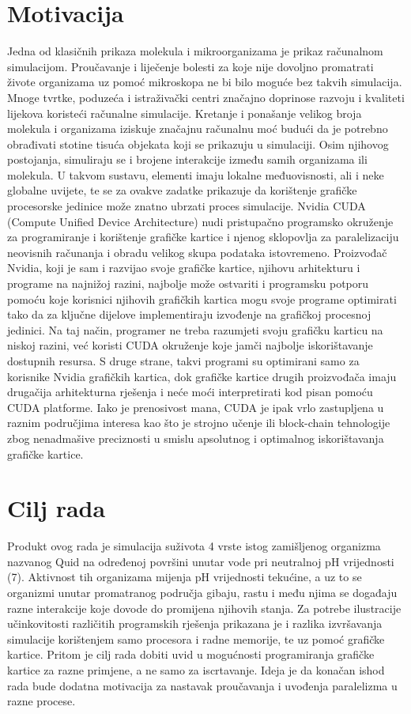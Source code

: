 \documentclass[12pt]{article}
\begin{document}
	\section{Motivacija}
Jedna od klasičnih prikaza molekula i mikroorganizama je prikaz računalnom simulacijom. 
	Proučavanje i liječenje bolesti
za koje nije dovoljno promatrati živote organizama uz pomoć mikroskopa 
	ne bi bilo moguće bez takvih simulacija.
Mnoge tvrtke, poduzeća i istraživački centri značajno
doprinose 
	razvoju i kvaliteti lijekova koristeći računalne simulacije. 
	Kretanje i ponašanje velikog broja molekula i organizama iziskuje značajnu računalnu moć budući da 
	je potrebno obrađivati stotine tisuća objekata koji
se prikazuju u simulaciji. Osim njihovog postojanja,
	simuliraju se i brojene interakcije između samih organizama ili molekula. U takvom sustavu, elementi imaju 
	lokalne međuovisnosti, ali i neke globalne uvijete, te se za ovakve zadatke prikazuje da korištenje grafičke
	procesorske jedinice može znatno ubrzati proces simulacije. Nvidia CUDA (Compute Unified Device Architecture) nudi pristupačno programsko okruženje 
	za programiranje i korištenje grafičke kartice i njenog sklopovlja za paralelizaciju neovisnih računanja 
	i obradu velikog skupa podataka istovremeno. Proizvođač Nvidia, koji je sam i razvijao svoje grafičke kartice, 
	njihovu arhitekturu i programe na najnižoj razini, najbolje može ostvariti i programsku potporu pomoću koje 
	korisnici njihovih grafičkih kartica mogu svoje programe optimirati tako da za ključne dijelove implementiraju
	izvođenje na grafičkoj procesnoj jedinici. Na taj način, programer ne treba razumjeti svoju grafičku karticu 
	na niskoj razini, već koristi CUDA okruženje koje jamči najbolje iskorištavanje dostupnih resursa. S druge strane,
	takvi programi su optimirani samo za korisnike Nvidia grafičkih kartica, dok grafičke kartice drugih proizvođača
	imaju drugačija arhitekturna rješenja i neće moći interpretirati kod pisan pomoću CUDA platforme. Iako je 
	prenosivost mana, CUDA je ipak vrlo zastupljena u raznim područjima interesa kao što je strojno učenje ili block-chain
	tehnologije zbog nenadmašive preciznosti u smislu apsolutnog i optimalnog iskorištavanja grafičke kartice. 
		
	
	\section{Cilj rada}
	Produkt ovog rada je simulacija suživota 4 vrste istog zamišljenog organizma nazvanog Quid na određenoj površini unutar vode 
	pri neutralnoj pH vrijednosti (7).
Aktivnost tih organizama mijenja pH vrijednosti tekućine, a uz to se organizmi 
	unutar promatranog područja gibaju, rastu i među njima se događaju razne interakcije koje dovode do promijena 
	njihovih stanja. Za potrebe ilustracije učinkovitosti različitih programskih rješenja prikazana je i razlika izvršavanja simulacije korištenjem samo procesora i radne memorije, te uz pomoć grafičke kartice.
Pritom je cilj rada dobiti uvid
	u mogućnosti programiranja grafičke kartice za razne primjene, a ne samo za iscrtavanje. Ideja je da konačan ishod rada
	bude dodatna motivacija za nastavak proučavanja i uvođenja paralelizma u razne procese. 
	
\end{document}
